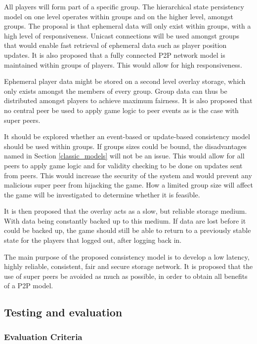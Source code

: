 \documentclass[journal,oneside,a4paper,onecolumn]{IEEEtran}
\begin{document}
All players will form part of a specific group. The hierarchical state persistency model on one level operates within groups and on the higher level, amongst groups. The proposal is that ephemeral data will only exist within groups, with a high level of responsiveness. Unicast connections will be used amongst groups that would enable fast retrieval of ephemeral data such as player position updates. It is also proposed that a fully connected P2P network model is maintained within groups of players. This would allow for high responsiveness.

Ephemeral player data might be stored on a second level overlay storage, which only exists amongst the members of every group. Group data can thus be distributed amongst players to achieve maximum fairness. It is also proposed that no central peer be used to apply game logic to peer events as is the case with super peers.

It should be explored whether an event-based or update-based consistency model should be used within groups. If groups sizes could be bound, the disadvantages named in Section \ref{classic_models} will not be an issue. This would allow for all peers to apply game logic and for validity checking to be done on updates sent from peers. This would increase the security of the system and would prevent any malicious super peer from hijacking the game. How a limited group size will affect the game will be investigated to determine whether it is feasible.

It is then proposed that the overlay acts as a slow, but reliable storage medium. With data being constantly backed up to this medium. If data are lost before it could be backed up, the game should still be able to return to a previously stable state for the players that logged out, after logging back in.

The main purpose of the proposed consistency model is to develop a low latency, highly reliable, consistent, fair and secure storage network. It is proposed that the use of super peers be avoided as much as possible, in order to obtain all benefits of a P2P model.


\subsection{Testing and evaluation}

\subsubsection{Evaluation Criteria}
\label{cm_eval_crit}
\end{document}
